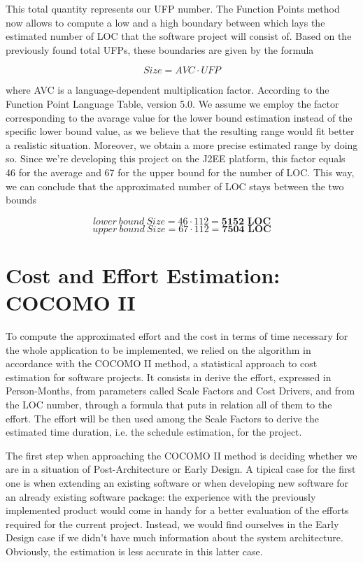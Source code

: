 This total quantity represents our UFP number.
The Function Points method now allows to compute a low and a high boundary between which lays the estimated number of LOC that the software project will consist of. Based on the previously found total UFPs, these boundaries are given by the formula

\[ Size = AVC \cdot UFP \]

where AVC is a language-dependent multiplication factor. According to the Function Point Language Table, version 5.0. We assume we employ the factor corresponding to the avarage value for the lower bound estimation instead of the specific lower bound value, as we believe that the resulting range would fit better a realistic situation. Moreover, we obtain a more precise estimated range by doing so. Since we're developing this project on the J2EE platform, this factor equals 46 for the average and 67 for the upper bound for the number of LOC. This way, we can conclude that the approximated number of LOC stays between the two bounds

\[ lower \> bound \> Size = 46 \cdot 112 = \textbf{5152 LOC} \]
\[ upper \> bound \> Size = 67 \cdot 112 = \textbf{7504 LOC} \]


\section{Cost and Effort Estimation: COCOMO II}

To compute the approximated effort and the cost in terms of time necessary for the whole application to be implemented, we relied on the algorithm in accordance with the COCOMO II method, a statistical approach to cost estimation for software projects. It consists in derive the effort, expressed in Person-Months, from parameters called Scale Factors and Cost Drivers, and from the LOC number, through a formula that puts in relation all of them to the effort. The effort will be then used among the Scale Factors to derive the estimated time duration, i.e. the schedule estimation, for the project.

The first step when approaching the COCOMO II method is deciding whether we are in a situation of Post-Architecture or Early Design. A tipical case for the first one is when extending an existing software or when developing new software for an already existing software package: the experience with the previously implemented product would come in handy for a better evaluation of the efforts required for the current project. Instead, we would find ourselves in the Early Design case if we didn't have much information about the system architecture. Obviously, the estimation is less accurate in this latter case.

